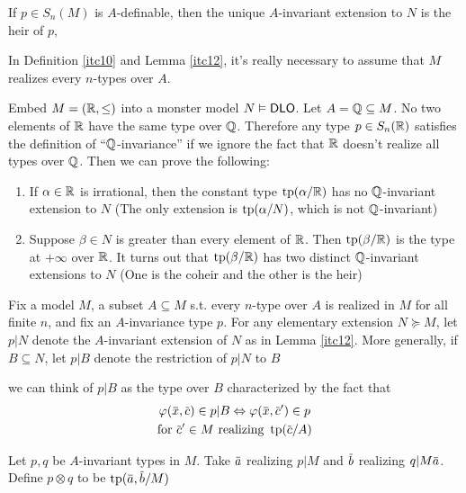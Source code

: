 \documentclass[11pt]{article}
\begin{document}
\begin{examplle}[]
If \(p\in S_n(M)\) is \(A\)-definable, then the unique \(A\)-invariant extension to \(N\) is the
heir of \(p\),
\end{examplle}

\begin{warning}
In Definition \ref{itc10} and Lemma \ref{itc12}, it's really necessary to assume that \(M\) realizes
every \(n\)-types over \(A\).

Embed \(M=(\mathbb{R},\le)\) into a monster model \(N\vDash\operatorname{\textsf{DLO}}\). Let \(A=\mathbb{Q}\subseteq M\). No two elements of \(\mathbb{R}\) have
the same type over \(\mathbb{Q}\). Therefore any type \(p\in S_n(\mathbb{R})\) satisfies the definition of
``\(\mathbb{Q}\)-invariance'' if we ignore the fact that \(\mathbb{R}\) doesn't realize all types over \(\mathbb{Q}\). Then
we can prove the following:
\begin{enumerate}
\item If \(\alpha\in\mathbb{R}\) is irrational, then the constant type \(\operatorname{tp}(\alpha/\mathbb{R})\) has no \(\mathbb{Q}\)-invariant
extension to \(N\) (The only extension is \(\operatorname{tp}(\alpha/N)\), which is not \(\mathbb{Q}\)-invariant)
\item Suppose \(\beta\in N\) is greater than every element of \(\mathbb{R}\). Then \(\operatorname{tp}(\beta/\mathbb{R})\) is the type
at \(+\infty\) over \(\mathbb{R}\). It turns out that \(\operatorname{tp}(\beta/\mathbb{R})\) has two distinct \(\mathbb{Q}\)-invariant
extensions to \(N\) (One is the coheir and the other is the heir)
\end{enumerate}
\end{warning}

Fix a model \(M\), a subset \(A\subseteq M\) s.t. every \(n\)-type over \(A\) is realized in \(M\) for
all finite \(n\), and fix an \(A\)-invariance type \(p\). For any elementary
extension \(N\succeq M\), let \(p|N\) denote the \(A\)-invariant extension of \(N\) as in Lemma
\ref{itc12}. More generally, if \(B\subseteq N\), let \(p|B\) denote the restriction of \(p|N\) to \(B\)

\begin{remark}
we can think of \(p|B\) as the type over \(B\) characterized by the fact that
\begin{gather*}
\varphi(\barx,\barc)\in p|B\Leftrightarrow\varphi(\barx,\barc')\in p\\
\text{for $\barc'\in M$ realizing }\tp(\barc/A)
\end{gather*}
\end{remark}

\begin{definition}[]
Let \(p,q\) be \(A\)-invariant types in \(M\).  Take \(\bara\) realizing \(p|M\)  and \(\barb\)
realizing \(q|M\bara\). Define \(p\otimes q\) to be \(\tp(\bara,\barb/M)\)
\end{definition}
\end{document}
